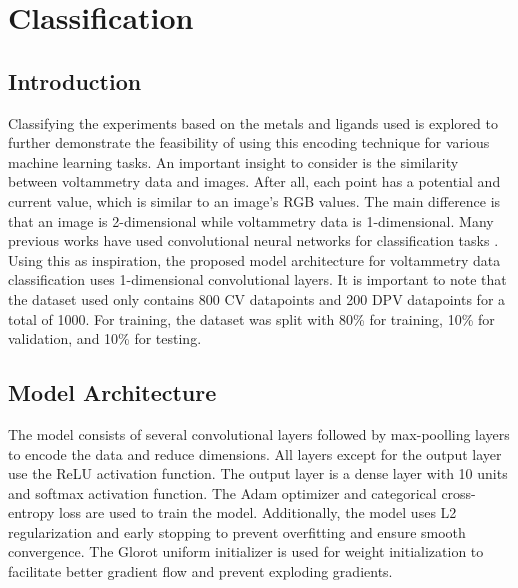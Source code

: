 \chapter{Classification} \label{chap:chap-3}




\section{Introduction}
Classifying the experiments based on the metals and ligands used is explored to further demonstrate the feasibility of using this encoding technique for various machine learning tasks. An important insight to consider is the similarity between voltammetry data and images. After all, each point has a potential and current value, which is similar to an image's RGB values. The main difference is that an image is 2-dimensional while voltammetry data is 1-dimensional. Many previous works have used convolutional neural networks for classification tasks \cite{SHARMA2018377}. Using this as inspiration, the proposed model architecture for voltammetry data classification uses 1-dimensional convolutional layers.  
It is important to note that the dataset used only contains 800 CV datapoints and 200 DPV datapoints for a total of 1000. For training, the dataset was split with 80\% for training, 10\% for validation, and 10\% for testing. 
\section{Model Architecture}
The model consists of several convolutional layers followed by max-poolling layers to encode the data and reduce dimensions. All layers except for the output layer use the ReLU activation function. The output layer is a dense layer with 10 units and softmax activation function. The Adam optimizer and categorical cross-entropy loss are used to train the model. Additionally, the model uses L2 regularization and early stopping to prevent overfitting and ensure smooth convergence. The Glorot uniform initializer is used for weight initialization to facilitate better gradient flow and prevent exploding gradients. 

